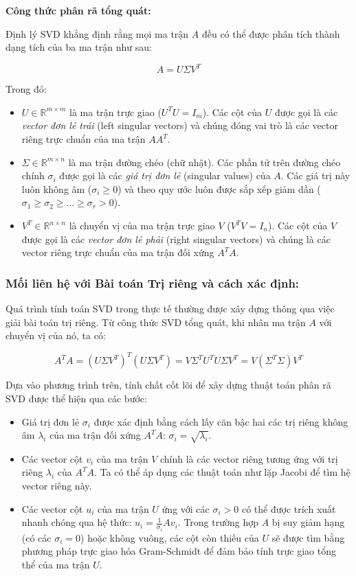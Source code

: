 \documentclass[a4paper]{article}
\begin{document}
\textbf{Công thức phân rã tổng quát:}

Định lý SVD khẳng định rằng mọi ma trận $A$ đều có thể được phân tích thành dạng tích của ba ma trận như sau:

\begin{equation}
A = U \Sigma V^T
\end{equation}

Trong đó:
\begin{itemize}
    \item $U \in \mathbb{R}^{m \times m}$ là ma trận trực giao ($U^T U = I_m$). Các cột của $U$ được gọi là các \textit{vector đơn lẻ trái} (left singular vectors) và chúng đóng vai trò là các vector riêng trực chuẩn của ma trận $A A^T$.
    \item $\Sigma \in \mathbb{R}^{m \times n}$ là ma trận đường chéo (chữ nhật). Các phần tử trên đường chéo chính $\sigma_i$ được gọi là các \textit{giá trị đơn lẻ} (singular values) của $A$. Các giá trị này luôn không âm ($\sigma_i \ge 0$) và theo quy ước luôn được sắp xếp giảm dần ($\sigma_1 \ge \sigma_2 \ge \dots \ge \sigma_r > 0$).
    \item $V^T \in \mathbb{R}^{n \times n}$ là chuyển vị của ma trận trực giao $V$ ($V^T V = I_n$). Các cột của $V$ được gọi là các \textit{vector đơn lẻ phải} (right singular vectors) và chúng là các vector riêng trực chuẩn của ma trận đối xứng $A^T A$.
\end{itemize}

\subsubsection{Mối liên hệ với Bài toán Trị riêng và cách xác định:}

Quá trình tính toán SVD trong thực tế thường được xây dựng thông qua việc giải bài toán trị riêng. Từ công thức SVD tổng quát, khi nhân ma trận $A$ với chuyển vị của nó, ta có:

\begin{equation}
A^T A = (U \Sigma V^T)^T (U \Sigma V^T) = V \Sigma^T U^T U \Sigma V^T = V (\Sigma^T \Sigma) V^T
\end{equation}

Dựa vào phương trình trên, tính chất cốt lõi để xây dựng thuật toán phân rã SVD được thể hiện qua các bước:
\begin{itemize}
    \item Giá trị đơn lẻ $\sigma_i$ được xác định bằng cách lấy căn bậc hai các trị riêng không âm $\lambda_i$ của ma trận đối xứng $A^T A$: $\sigma_i = \sqrt{\lambda_i}$.
    \item Các vector cột $v_i$ của ma trận $V$ chính là các vector riêng tương ứng với trị riêng $\lambda_i$ của $A^T A$. Ta có thể áp dụng các thuật toán như lặp Jacobi để tìm hệ vector riêng này.
    \item Các vector cột $u_i$ của ma trận $U$ ứng với các $\sigma_i > 0$ có thể được trích xuất nhanh chóng qua hệ thức: $u_i = \frac{1}{\sigma_i} A v_i$. Trong trường hợp $A$ bị suy giảm hạng (có các $\sigma_i = 0$) hoặc không vuông, các cột còn thiếu của $U$ sẽ được tìm bằng phương pháp trực giao hóa Gram-Schmidt để đảm bảo tính trực giao tổng thể của ma trận $U$.
\end{itemize}
\end{document}
